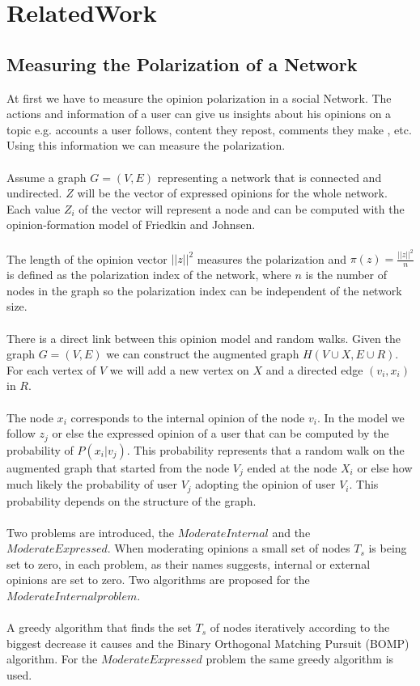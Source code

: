 \chapter{RelatedWork}
\label{ch:Instructions}


\section{Measuring the Polarization of a Network}
\label{sec:Submission}

At first we have to measure the opinion polarization in a social Network. The actions and information of a user can give us insights about his opinions on a topic e.g. accounts a user follows, content they repost, comments they make , etc. Using this information we can measure the polarization. 
\\
\\
Assume a graph $G = (V,E)$ representing a network that is connected and undirected. $Z$ will be the vector of expressed opinions for the whole network. Each value $Z_i$ of the vector will represent a node and can be computed with the opinion-formation model of Friedkin and Johnsen. 
\\
\\
The length of the opinion vector $||z|| ^2$ measures  the polarization and  $\pi(z) = \frac{||z|| ^2}n$ is defined as the polarization index of the network, where  $n$ is the number of nodes in the graph so the polarization index can be independent of the network size. 
\\
\\
There is a direct link between this opinion model and random walks. Given the graph $G = (V,E)$ we can construct the augmented graph $H(V∪X, E∪R)$. For each vertex of  $V$ we will add a new vertex on $X$ and a directed edge $(v_i,x_i)$ in $R$. 
\\
\\
The node $x_i$ corresponds to the internal opinion of the node $v_i$. In the model we follow $z_j$ or else the expressed opinion of a user that can be computed by the probability of $P(x_i |v_j)$. This probability represents that a random walk on the augmented graph that started from the node $V_j$ ended at the node $X_i$ or else how much likely the probability of user $V_j$ adopting the opinion of user $V_i$. This probability depends on the structure of the graph. 
\\
\\
Two problems are introduced, the $ModerateInternal$ and the $ModerateExpressed$. When moderating opinions a small set of nodes $T_s$ is being set to zero, in each problem, as their names suggests, internal or external opinions are set to zero. Two algorithms are proposed for the $ModerateInternal problem$. 
\\
\\
A greedy algorithm that finds the set $T_s$ of nodes iteratively according to the biggest decrease it causes and the Binary Orthogonal Matching Pursuit (BOMP) algorithm. For the $ModerateExpressed$ problem the same greedy algorithm is used.
\cite{tsapMatakosTerzi}


